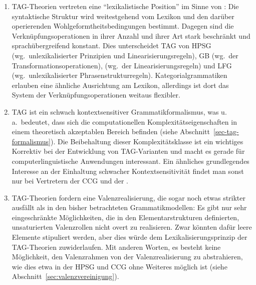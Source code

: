 {\setlength{\leftmargini}{15pt}
\begin{enumerate}
  \item TAG-Theorien vertreten eine "`lexikalistische Position"' im Sinne von \cite{Wunderlich:85}: Die syntaktische Struktur wird weitestgehend vom Lexikon und den darüber operierenden Wohlgeformtheitsbedingungen bestimmt. Dagegen sind die Verknüpfungsoperationen in ihrer Anzahl und ihrer Art stark beschränkt und sprachübergreifend konstant. Dies unterscheidet TAG von HPSG (wg.\ unlexikalisierter Prinzipien und Linearisierungsregeln), GB (wg.\ der Transformationsoperationen),  (wg.\ der Linearisierungsregeln) und LFG (wg.\ unlexikalisierter Phrasenstrukturregeln). Kategorialgrammatiken erlauben eine ähnliche Ausrichtung am Lexikon, allerdings ist dort das System der Verknüpfungsoperationen weitaus flexibler.
  
  \item TAG ist ein schwach kontextsensitiver Grammatikformalismus, was u.\,a.\ bedeutet, dass sich die computationellen Komplexitätseigenschaften in einem theoretisch akzeptablen Bereich befinden (siehe Abschnitt~\ref{sec-tag-formalismus}). Die Beibehaltung dieser Komplexitätsklasse ist ein wichtiges Korrektiv bei der Entwicklung von TAG-Varianten und macht es gerade für computerlinguistische Anwendungen interessant. Ein ähnliches grundlegendes Interesse an der Einhaltung schwacher Kontextsensitivität findet man sonst nur bei Vertretern der CCG \citep[22f]{Steedman:00} und der  \citep{Stabler:97,Michaelis:01a,Michaelis:01b}.

  \item TAG-Theorien fordern eine Valenzrealisierung, die sogar noch etwas strikter ausfällt als in den bisher betrachteten Grammatikmodellen: Es gibt nur sehr eingeschränkte Möglichkeiten, die in den Elementarstrukturen definierten, unsaturierten Valenzrollen nicht overt zu realisieren. Zwar könnten dafür leere Elemente stipuliert werden, aber dies würde dem Lexikalisierungsprinzip der TAG-Theorien zuwiderlaufen. Mit anderen Worten, es besteht keine Möglichkeit, den Valenzrahmen von der Valenzrealisierung zu abstrahieren, wie dies etwa in der HPSG und CCG ohne Weiteres möglich ist (siehe Abschnitt~\ref{sec:valenzvereinigung}).   
 
\end{enumerate}
}

